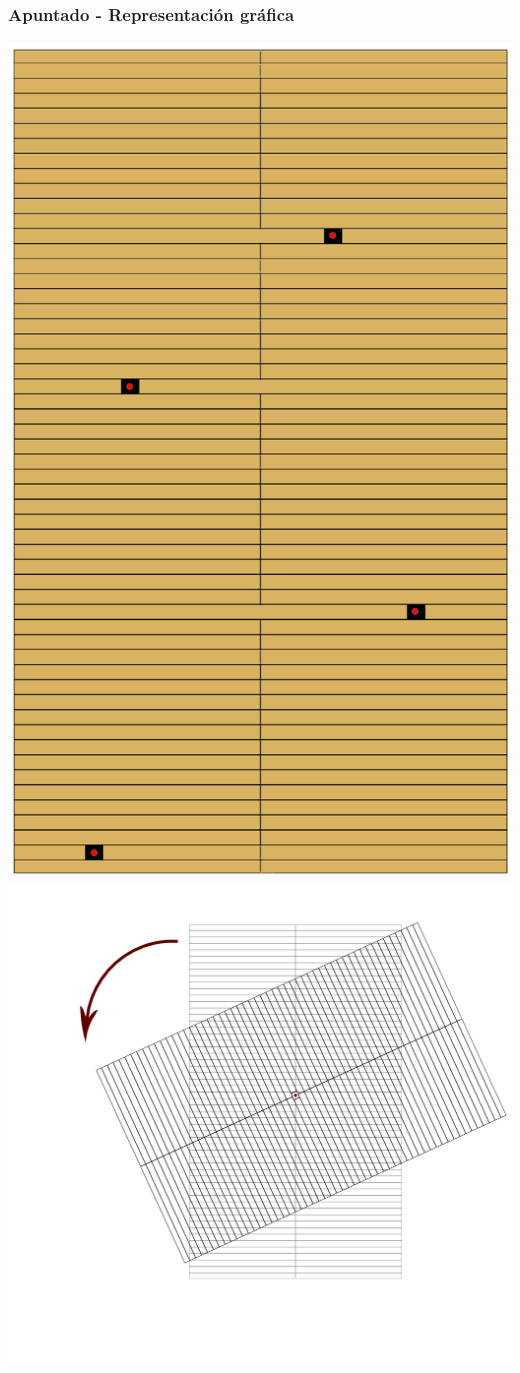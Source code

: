 \begin{frame}
    \frametitle{Apuntado - Representación gráfica}
    \includegraphics[height=0.8\textheight]{FIGURES/CSU-puntos}
    \includegraphics[width=0.7\linewidth]{FIGURES/CSU-giro}
\end{frame}

